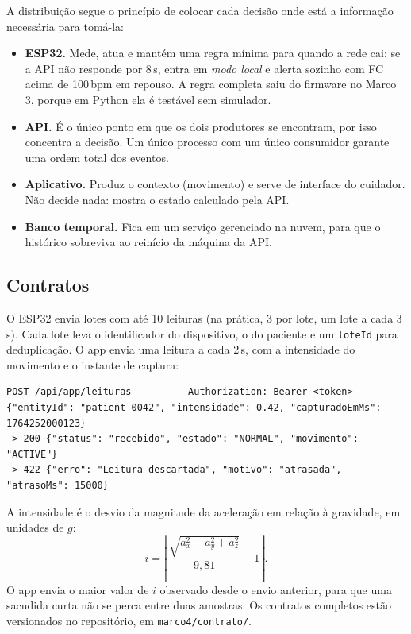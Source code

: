 \documentclass[12pt,a4paper]{article}
\begin{document}
A distribuição segue o princípio de colocar cada decisão onde está a informação necessária para tomá-la:
\begin{itemize}
  \item \textbf{ESP32.} Mede, atua e mantém uma regra mínima para quando a rede cai: se a API não responde por 8\,s, entra em \emph{modo local} e alerta sozinho com FC acima de 100\,bpm em repouso. A regra completa saiu do firmware no Marco 3, porque em Python ela é testável sem simulador.
  \item \textbf{API.} É o único ponto em que os dois produtores se encontram, por isso concentra a decisão. Um único processo com um único consumidor garante uma ordem total dos eventos.
  \item \textbf{Aplicativo.} Produz o contexto (movimento) e serve de interface do cuidador. Não decide nada: mostra o estado calculado pela API.
  \item \textbf{Banco temporal.} Fica em um serviço gerenciado na nuvem, para que o histórico sobreviva ao reinício da máquina da API.
\end{itemize}

\subsection{Contratos}

O ESP32 envia lotes com até 10 leituras (na prática, 3 por lote, um lote a cada 3\,s).
Cada lote leva o identificador do dispositivo, o do paciente e um \texttt{loteId} para deduplicação.
O app envia uma leitura a cada 2\,s, com a intensidade do movimento e o instante de captura:

\begin{lstlisting}
POST /api/app/leituras          Authorization: Bearer <token>
{"entityId": "patient-0042", "intensidade": 0.42, "capturadoEmMs": 1764252000123}
-> 200 {"status": "recebido", "estado": "NORMAL", "movimento": "ACTIVE"}
-> 422 {"erro": "Leitura descartada", "motivo": "atrasada", "atrasoMs": 15000}
\end{lstlisting}

A intensidade é o desvio da magnitude da aceleração em relação à gravidade, em unidades de $g$:
\begin{equation}
  i = \left|\, \frac{\sqrt{a_x^2 + a_y^2 + a_z^2}}{9{,}81} - 1 \,\right|.
\end{equation}
O app envia o maior valor de $i$ observado desde o envio anterior, para que uma sacudida curta não se perca entre duas amostras.
Os contratos completos estão versionados no repositório, em \texttt{marco4/contrato/}.
\end{document}
